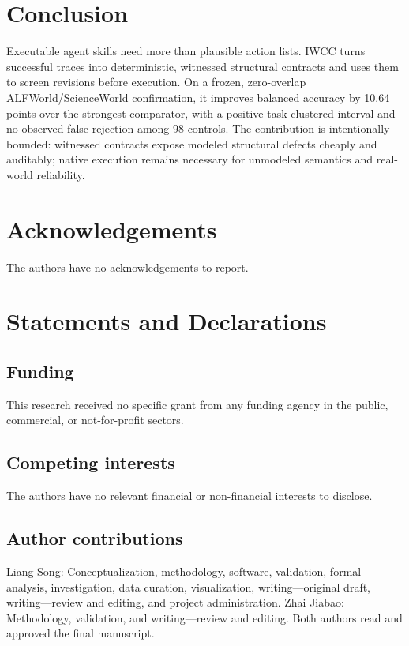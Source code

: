 \documentclass[pdflatex,sn-basic]{sn-jnl}
\newcommand{\ControlCount}{98}
\newcommand{\GainPoints}{10.64}
\begin{document}
\section{Conclusion}
Executable agent skills need more than plausible action lists. IWCC turns successful traces into deterministic, witnessed structural contracts and uses them to screen revisions before execution. On a frozen, zero-overlap ALFWorld/ScienceWorld confirmation, it improves balanced accuracy by \GainPoints{} points over the strongest comparator, with a positive task-clustered interval and no observed false rejection among \ControlCount{} controls. The contribution is intentionally bounded: witnessed contracts expose modeled structural defects cheaply and auditably; native execution remains necessary for unmodeled semantics and real-world reliability.

\backmatter

\section*{Acknowledgements}
The authors have no acknowledgements to report.

\section*{Statements and Declarations}

\subsection*{Funding}
This research received no specific grant from any funding agency in the public,
commercial, or not-for-profit sectors.

\subsection*{Competing interests}
The authors have no relevant financial or non-financial interests to disclose.

\subsection*{Author contributions}
Liang Song: Conceptualization, methodology, software, validation, formal
analysis, investigation, data curation, visualization, writing---original
draft, writing---review and editing, and project administration. Zhai Jiabao:
Methodology, validation, and writing---review and editing. Both authors read
and approved the final manuscript.
\end{document}
